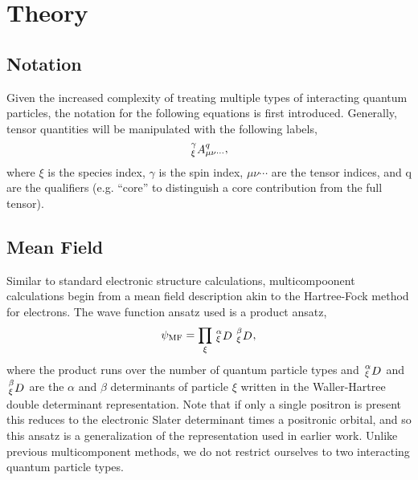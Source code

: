 \section{Theory}
\subsection{Notation}
Given the increased complexity of treating multiple types of interacting quantum particles, the notation for the following equations is first introduced.
Generally, tensor quantities will be manipulated with the following labels,
\begin{equation}
   \shivten{\gamma}{\xi}{A}{q}{\mu\nu\cdots},
\end{equation}
where $\xi$ is the species index, $\gamma$ is the spin index, $\mu\nu\cdots$ are the tensor indices, and q are the qualifiers (e.g. ``core'' to distinguish a core contribution from the full tensor).

\subsection{Mean Field}

Similar to standard electronic structure calculations, multicompoonent calculations begin from a mean field description akin to the Hartree-Fock method for electrons.
The wave function ansatz used is a product ansatz, 
\begin{equation}
    \psi_{\textrm{MF}} = \prod_{\xi} \shivten{\alpha}{\xi}{D}{}{} \shivten{\beta}{\xi}{D}{}{},
\end{equation}
where the product runs over the number of quantum particle types and $\shivten{\alpha}{\xi}{D}{}{}$ and $\shivten{\beta}{\xi}{D}{}{}$ are the $\alpha$ and $\beta$ determinants of particle $\xi$ written in the Waller-Hartree double determinant representation.
Note that if only a single positron is present this reduces to the electronic Slater determinant times a positronic orbital, and so this ansatz is a generalization of the representation used in earlier work.\cite{10.1088/0022-3700/11/16/001, 10.1088/0022-3700/12/15/007,10.1063/1.438933,10.1063/1.442211,10.1088/0022-3700/14/22/019}
Unlike previous multicomponent methods, we do not restrict ourselves to two interacting quantum particle types.

